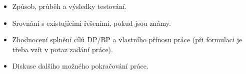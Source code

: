 \documentclass[11pt,twoside,a4paper]{book}
\begin{document}
%


%

%





%

\begin{itemize}
 \item Způsob, průběh a výsledky testování.
 \item Srovnání s existujícími řešeními, pokud jsou známy.
\end{itemize} 




\begin{itemize}
\item Zhodnocení splnění cílů DP/BP a  vlastního přínosu práce (při formulaci je třeba vzít v potaz zadání práce).
\item Diskuse dalšího možného pokračování práce.
\end{itemize} 




%

\end{document}
